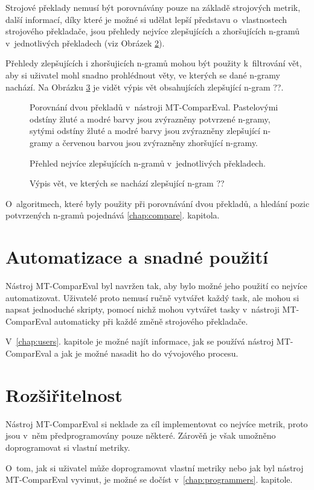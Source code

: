 Strojové překlady nemusí být porovnávány pouze na základě strojových metrik,
  další informací,
  díky které je možné si udělat lepší představu o~vlastnostech strojového překladače,
  jsou přehledy nejvíce zlepšujících a zhoršujících \mbox{n-gramů} v~jednotlivých překladech (viz Obrázek \ref{img:confirmed_ngrams}).

Přehledy zlepšujících i zhoršujicích \mbox{n-gramů} mohou být použity k~filtrování vět,
  aby si uživatel mohl snadno prohlédnout věty,
  ve kterých se dané \mbox{n-gramy} nachází.
Na Obrázku \ref{img:filtered_sentences} je vidět výpis vět obsahujících zlepšující \mbox{n-gram} ??.

\begin{figure}
	\caption{
		Porovnání dvou překladů v~nástroji \mbox{MT-ComparEval}.
		Pastelovými odstíny žluté a modré barvy jsou zvýrazněny potvrzené \mbox{n-gramy},
		sytými odstíny žluté a modré barvy jsou zvýrazněny zlepšující \mbox{n-gramy}
		a červenou barvou jsou zvýrazněny zhoršující \mbox{n-gramy}.
	}
	\label{img:compare_sentences}
\end{figure}

\begin{figure}
	\caption{Přehled nejvíce zlepšujících \mbox{n-gramů} v~jednotlivých překladech.}
	\label{img:confirmed_ngrams}
\end{figure}

\begin{figure}
	\caption{Výpis vět, ve kterých se nachází zlepšující \mbox{n-gram} ??}
	\label{img:filtered_sentences}
\end{figure}

O~algoritmech,
  které byly použity při porovnávání dvou překladů,
  a hledání pozic potvrzených \mbox{n-gramů}
  pojednává \ref{chap:compare}. kapitola.


\section{Automatizace a snadné použití}
Nástroj \mbox{MT-ComparEval} byl navržen tak,
  aby bylo možné jeho použití co nejvíce automatizovat.
Uživatelé proto nemusí ručně vytvářet každý task,
  ale mohou si napsat jednoduché skripty,
  pomocí nichž mohou vytvářet tasky v~nástroji \mbox{MT-ComparEval} automaticky při každé změně strojového překladače.

V~\ref{chap:users}. kapitole je možné najít informace,
  jak se používá nástroj \mbox{MT-ComparEval}
  a jak je možné nasadit ho do vývojového procesu.

\section{Rozšiřitelnost}
Nástroj \mbox{MT-ComparEval} si neklade za cíl implementovat co nejvíce metrik,
  proto jsou v~něm předprogramovány pouze některé.
Zárověň je však umožněno doprogramovat si vlastní metriky.

O~tom, jak si uživatel může doprogramovat vlastní metriky nebo jak byl nástroj \mbox{MT-ComparEval} vyvinut,
  je možné se dočíst v~\ref{chap:programmers}. kapitole.

